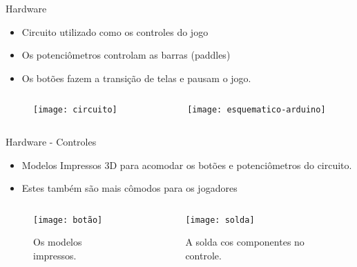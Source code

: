 \begin{frame}[t]{Hardware}

	\begin{itemize}
        \item Circuito utilizado como os controles do jogo
	\item Os potenciômetros controlam as barras (paddles)
	\item Os botões fazem a transição de telas e pausam o jogo.
    \end{itemize}
   
	\vspace{0.3cm}
	\begin{columns}
		\begin{column}{0.5\textwidth}
			\begin{figure}
				\centering
					\texttt{[image: circuito]}
			\end{figure}
		\end{column}
			\begin{column}{0.7\textwidth}
				\begin{figure}
					\centering
						\texttt{[image: esquematico-arduino]}
				\end{figure}
			\end{column}
		\end{columns}

\end{frame}
\begin{frame}[c]{Hardware - Controles}
 
  \begin{itemize}
      \item Modelos Impressos 3D para acomodar os botões e potenciômetros do circuito.
	\item Estes também são mais cômodos para os jogadores
    \end{itemize}
\vspace{0.3cm}
\begin{columns}
	\begin{column}{0.4\textwidth}
		\begin{figure}
			\centering
    			\texttt{[image: botão]}
    			\caption{Os modelos impressos.}
		\end{figure}
	\end{column}
		\begin{column}{0.4\textwidth}
			\begin{figure}
				\centering
    				\texttt{[image: solda]}
    				\caption{A solda cos componentes no controle.}
			\end{figure}
		\end{column}
	\end{columns}
 \end{frame}
